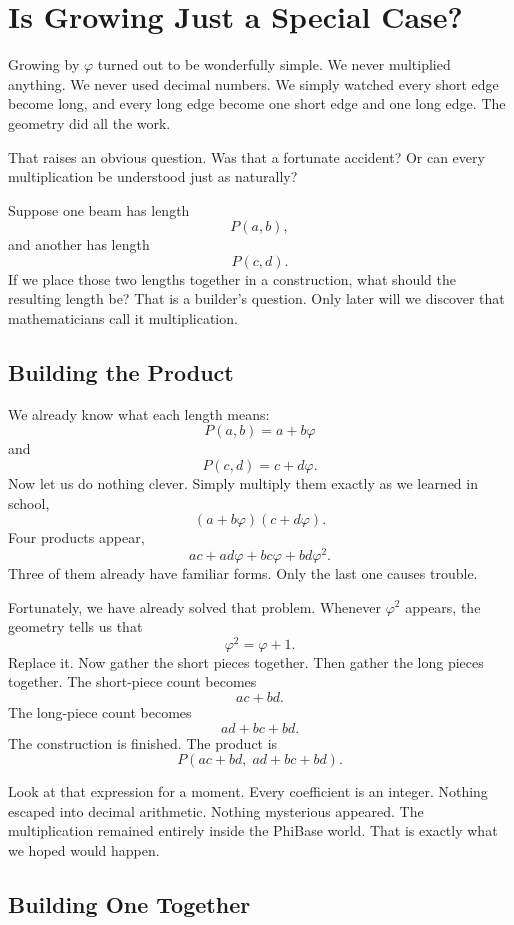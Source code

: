 \chapter{Is Growing Just a Special Case?}
\label{stone:multiply}

Growing by \(\varphi\) turned out to be wonderfully simple. We never multiplied anything. We never used decimal numbers. We simply watched every short edge become long, and every long edge become one short edge and one long edge. The geometry did all the work.

That raises an obvious question. Was that a fortunate accident? Or can every multiplication be understood just as naturally?

Suppose one beam has length
\[
P(a,b),
\]
and another has length
\[
P(c,d).
\]
If we place those two lengths together in a construction, what should the resulting length be? That is a builder's question. Only later will we discover that mathematicians call it multiplication.

\section*{Building the Product}

We already know what each length means:
\[
P(a,b) = a+b\varphi
\]
and
\[
P(c,d) = c+d\varphi.
\]
Now let us do nothing clever. Simply multiply them exactly as we learned in school,
\[
(a+b\varphi)(c+d\varphi).
\]
Four products appear,
\[
ac + ad\varphi + bc\varphi + bd\varphi^2.
\]
Three of them already have familiar forms. Only the last one causes trouble.

Fortunately, we have already solved that problem. Whenever \(\varphi^2\) appears, the geometry tells us that
\[
\varphi^2=\varphi+1.
\]
Replace it. Now gather the short pieces together. Then gather the long pieces together. The short-piece count becomes
\[
ac+bd.
\]
The long-piece count becomes
\[
ad+bc+bd.
\]
The construction is finished. The product is
\[
P(ac+bd,\; ad+bc+bd).
\]

Look at that expression for a moment. Every coefficient is an integer. Nothing escaped into decimal arithmetic. Nothing mysterious appeared. The multiplication remained entirely inside the PhiBase world. That is exactly what we hoped would happen.

\section*{Building One Together}


